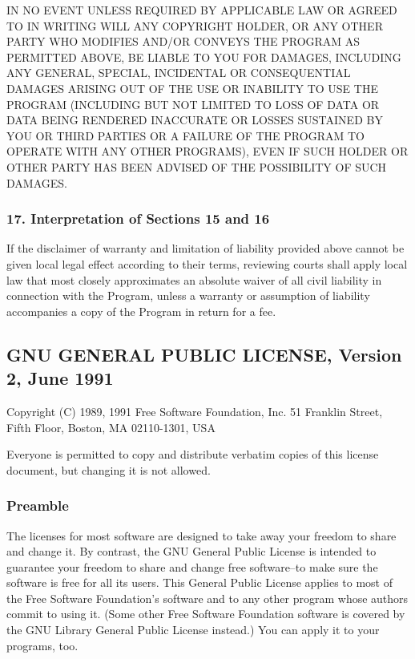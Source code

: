 \documentclass[a4paper, 11pt, twoside]{article}
\begin{document}
IN NO EVENT UNLESS REQUIRED BY APPLICABLE LAW OR AGREED TO IN WRITING WILL ANY COPYRIGHT HOLDER, OR ANY OTHER PARTY WHO MODIFIES AND/OR CONVEYS THE PROGRAM AS PERMITTED ABOVE, BE LIABLE TO YOU FOR DAMAGES, INCLUDING ANY GENERAL, SPECIAL, INCIDENTAL OR CONSEQUENTIAL DAMAGES ARISING OUT OF THE USE OR INABILITY TO USE THE PROGRAM (INCLUDING BUT NOT LIMITED TO LOSS OF DATA OR DATA BEING RENDERED INACCURATE OR LOSSES SUSTAINED BY YOU OR THIRD PARTIES OR A FAILURE OF THE PROGRAM TO OPERATE WITH ANY OTHER PROGRAMS), EVEN IF SUCH HOLDER OR OTHER PARTY HAS BEEN ADVISED OF THE POSSIBILITY OF SUCH DAMAGES.

\subsubsection{17. Interpretation of Sections 15 and 16}

If the disclaimer of warranty and limitation of liability provided above cannot be given local legal effect according to their terms, reviewing courts shall apply local law that most closely approximates an absolute waiver of all civil liability in connection with the Program, unless a warranty or assumption of liability accompanies a copy of the Program in return for a fee.

\subsection{GNU GENERAL PUBLIC LICENSE, Version 2, June 1991}

Copyright (C) 1989, 1991 Free Software Foundation, Inc. 51 Franklin Street, Fifth Floor, Boston, MA  02110-1301, USA

Everyone is permitted to copy and distribute verbatim copies of this license document, but changing it is not allowed.

\subsubsection{Preamble}

The licenses for most software are designed to take away your freedom to share and change it. By contrast, the GNU General Public License is intended to guarantee your freedom to share and change free software--to make sure the software is free for all its users. This General Public License applies to most of the Free Software Foundation's software and to any other program whose authors commit to using it. (Some other Free Software Foundation software is covered by the GNU Library General Public License instead.) You can apply it to your programs, too.
\end{document}
